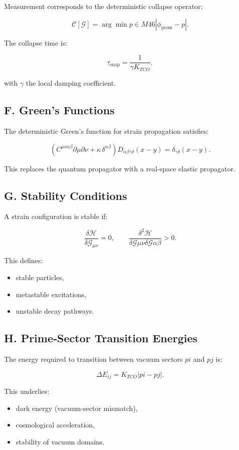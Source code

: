 \documentclass[reprint,amsmath,amssymb,aps,prl,floatfix]{revtex4-2}
\begin{document}
\begin{itemize}
Measurement corresponds to the deterministic collapse operator:

\[
\mathcal{C}[\mathcal{G}]
=
\arg\min{p \in M{46}}
\left|
\phi_{\mathrm{geom}} - p
\right|.
\]

The collapse time is:

\[
\tau_{\mathrm{snap}}
=
\frac{1}{\gamma K_{TCO}},
\]

with \(\gamma\) the local damping coefficient.

\subsection{F. Green’s Functions}

The deterministic Green’s function for strain propagation satisfies:

\[
\left(
C^{\mu\nu\alpha\beta}\partial\mu\partial\nu
+
\kappa\,\delta^{\alpha\beta}
\right)
D_{\alpha\beta\gamma\delta}(x-y)
=
\delta_{\gamma\delta}(x-y).
\]

This replaces the quantum propagator with a real‑space elastic propagator.

\subsection{G. Stability Conditions}

A strain configuration is stable if:

\[
\frac{\delta \mathcal{H}}{\delta \mathcal{G}_{\mu\nu}} = 0,
\qquad
\frac{\delta^2 \mathcal{H}}{\delta \mathcal{G}{\mu\nu}\delta \mathcal{G}{\alpha\beta}} > 0.
\]

This defines:
\begin{itemize}
\item stable particles,  
\item metastable excitations,  
\item unstable decay pathways.
\end{itemize}

\subsection{H. Prime‑Sector Transition Energies}

The energy required to transition between vacuum sectors \(pi\) and \(pj\) is:

\[
\Delta E_{ij}
=
K_{TCO}
\left|
pi - pj
\right|.
\]

This underlies:
\begin{itemize}
\item dark energy (vacuum‑sector mismatch),  
\item cosmological acceleration,  
\item stability of vacuum domains.
\end{itemize}


\end{itemize}
\end{document}
